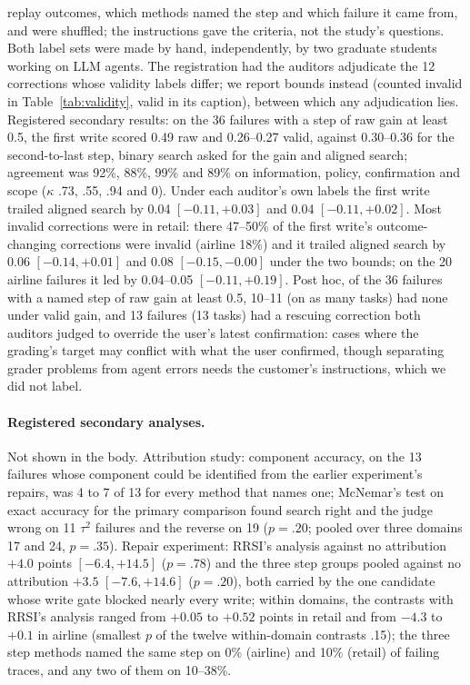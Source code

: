 \documentclass[11pt]{article}
\begin{document}
replay outcomes, which methods named the step and which failure it came from, and were shuffled; the instructions gave the criteria, not the study's questions. Both label sets were made by hand, independently, by two graduate students working on LLM agents. The registration had the auditors adjudicate the 12 corrections whose validity labels differ; we report bounds instead (counted invalid in Table~\ref{tab:validity}, valid in its caption), between which any adjudication lies. Registered secondary results: on the 36 failures with a step of raw gain at least 0.5, the first write scored 0.49 raw and 0.26--0.27 valid, against 0.30--0.36 for the second-to-last step, binary search asked for the gain and aligned search; agreement was 92\%, 88\%, 99\% and 89\% on information, policy, confirmation and scope ($\kappa$ .73, .55, .94 and 0). Under each auditor's own labels the first write trailed aligned search by 0.04 $[-0.11,+0.03]$ and 0.04 $[-0.11,+0.02]$. Most invalid corrections were in retail: there 47--50\% of the first write's outcome-changing corrections were invalid (airline 18\%) and it trailed aligned search by 0.06 $[-0.14,+0.01]$ and 0.08 $[-0.15,-0.00]$ under the two bounds; on the 20 airline failures it led by 0.04--0.05 $[-0.11,+0.19]$. Post hoc, of the 36 failures with a named step of raw gain at least 0.5, 10--11 (on as many tasks) had none under valid gain, and 13 failures (13 tasks) had a rescuing correction both auditors judged to override the user's latest confirmation: cases where the grading's target may conflict with what the user confirmed, though separating grader problems from agent errors needs the customer's instructions, which we did not label.

\paragraph{Registered secondary analyses.} Not shown in the body. Attribution study: component accuracy, on the 13 failures whose component could be identified from the earlier experiment's repairs, was 4 to 7 of 13 for every method that names one; McNemar's test on exact accuracy for the primary comparison found search right and the judge wrong on 11 $\tau^2$ failures and the reverse on 19 ($p=.20$; pooled over three domains 17 and 24, $p=.35$). Repair experiment: RRSI's analysis against no attribution $+4.0$ points $[-6.4,+14.5]$ ($p=.78$) and the three step groups pooled against no attribution $+3.5$ $[-7.6,+14.6]$ ($p=.20$), both carried by the one candidate whose write gate blocked nearly every write; within domains, the contrasts with RRSI's analysis ranged from $+0.05$ to $+0.52$ points in retail and from $-4.3$ to $+0.1$ in airline (smallest $p$ of the twelve within-domain contrasts .15); the three step methods named the same step on 0\% (airline) and 10\% (retail) of failing traces, and any two of them on 10--38\%.
\end{document}
